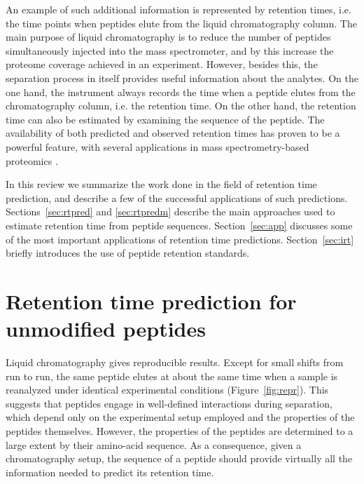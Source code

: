 \documentclass[a4paper]{article}
\begin{document}
An example of such additional information is represented by retention
times, i.e. the time points when peptides elute from the liquid
chromatography column.  The main purpose of liquid chromatography is
to reduce the number of peptides simultaneously injected into the mass
spectrometer, and by this increase the proteome coverage achieved in
an experiment.  However, besides this, the separation process in
itself provides useful information about the analytes. On the one
hand, the instrument always records the time when a peptide elutes
from the chromatography column, i.e. the retention time. On the other
hand, the retention time can also be estimated by examining the
sequence of the peptide. The availability of both predicted and
observed retention times has proven to be a powerful feature, with
several applications in mass spectrometry-based proteomics
\cite{Palmblad2013}.


In this review we summarize the work done in the field of retention
time prediction, and describe a few of the successful applications of
such predictions. Sections~\ref{sec:rtpred} and \ref{sec:rtpredm}
describe the main approaches used to estimate retention time from
peptide sequences. Section~\ref{sec:app} discusses some of the most
important applications of retention time predictions.
Section~\ref{sec:irt} briefly introduces the use of peptide retention
standards.


\section{\label{sec:rtpred}Retention time prediction for unmodified peptides}


Liquid chromatography gives reproducible results. Except for small
shifts from run to run, the same peptide elutes at about the same time
when a sample is reanalyzed under identical experimental conditions
(Figure~\ref{fig:repr}). This suggests that peptides engage in
well-defined interactions during separation, which depend only on the
experimental setup employed and the properties of the peptides
themselves. However, the properties of the peptides are determined to
a large extent by their amino-acid sequence. As a consequence, given a
chromatography setup, the sequence of a peptide should provide
virtually all the information needed to predict its retention time.
\end{document}
